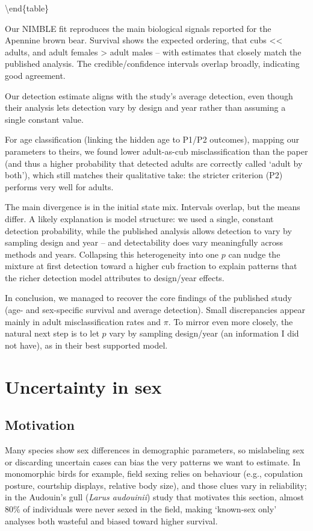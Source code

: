 \documentclass[
  12pt,
]{krantz}
\begin{document}
\textbackslash end\{table\}

Our NIMBLE fit reproduces the main biological signals reported for the Apennine brown bear. Survival shows the expected ordering, that cubs \textless\textless{} adults, and adult females \textgreater{} adult males -- with estimates that closely match the published analysis. The credible/confidence intervals overlap broadly, indicating good agreement.

Our detection estimate aligns with the study's average detection, even though their analysis lets detection vary by design and year rather than assuming a single constant value.

For age classification (linking the hidden age to P1/P2 outcomes), mapping our parameters to theirs, we found lower adult-as-cub misclassification than the paper (and thus a higher probability that detected adults are correctly called `adult by both'), which still matches their qualitative take: the stricter criterion (P2) performs very well for adults.

The main divergence is in the initial state mix. Intervals overlap, but the means differ. A likely explanation is model structure: we used a single, constant detection probability, while the published analysis allows detection to vary by sampling design and year -- and detectability does vary meaningfully across methods and years. Collapsing this heterogeneity into one \(p\) can nudge the mixture at first detection toward a higher cub fraction to explain patterns that the richer detection model attributes to design/year effects.

In conclusion, we managed to recover the core findings of the published study (age- and sex-specific survival and average detection). Small discrepancies appear mainly in adult misclassification rates and \(\pi\). To mirror \citet{Gervasi2017} even more closely, the natural next step is to let \(p\) vary by sampling design/year (an information I did not have), as in their best supported model.

\section{Uncertainty in sex}\label{uncertainty-in-sex}

\subsection{Motivation}\label{motivation-2}

Many species show sex differences in demographic parameters, so mislabeling sex or discarding uncertain cases can bias the very patterns we want to estimate. In monomorphic birds for example, field sexing relies on behaviour (e.g., copulation posture, courtship displays, relative body size), and those clues vary in reliability; in the Audouin's gull (\emph{Larus audouinii}) study that motivates this section, almost 80\% of individuals were never sexed in the field, making `known-sex only' analyses both wasteful and biased toward higher survival.
\end{document}
